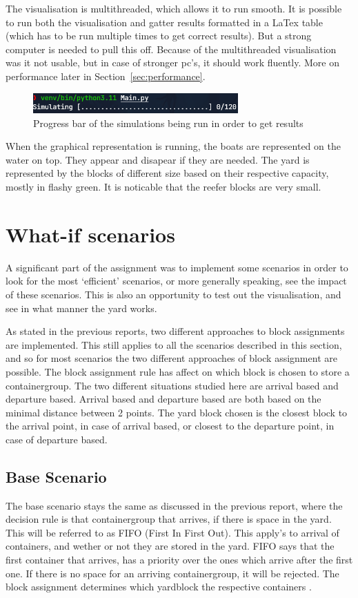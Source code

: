 \documentclass{article}
\begin{document}
The visualisation is multithreaded, which allows it to run smooth. It is
possible to run both the visualisation and gatter results formatted in a LaTex
table (which has to be run multiple times to get correct results). But a strong
computer is needed to pull this off. Because of the multithreaded visualisation
was it not usable, but in case of stronger pc's, it should work fluently. More
on performance later in Section~\ref{sec:performance}.
\begin{figure}
    \centering
    \includegraphics[width=0.7\textwidth]{fig/progressbar.png}
    \caption{Progress bar of the simulations being run in order to get results}\label{fig:visualisation}
\end{figure}

When the graphical representation is running, the boats are represented on the
water on top. They appear and disapear if they are needed. The yard is
represented by the blocks of different size based on their respective capacity,
mostly in flashy green. It is noticable that the reefer blocks are very small.

\section{What-if scenarios}
A significant part of the assignment was to implement some scenarios in order
to look for the most `efficient' scenarios, or more generally speaking, see the
impact of these scenarios. This is also an opportunity to test out the
visualisation, and see in what manner the yard works.

As stated in the previous reports, two different approaches to block
assignments are implemented. This still applies to all the scenarios described
in this section, and so for most scenarios the two different approaches of
block assignment are possible. The block assignment rule has affect on which
block is chosen to store a containergroup. The two different situations studied
here are arrival based and departure based. Arrival based and departure based
are both based on the minimal distance between 2 points. The yard block chosen
is the closest block to the arrival point, in case of arrival based, or closest
to the departure point, in case of departure based.

\subsection{Base Scenario}
The base scenario stays the same as discussed in the previous report, where the
decision rule is that containergroup that arrives, if there is space in the
yard. This will be referred to as FIFO (First In First Out). This apply’s to
arrival of containers, and wether or not they are stored in the yard. FIFO says
that the first container that arrives, has a priority over the ones which
arrive after the first one. If there is no space for an arriving
containergroup, it will be rejected. The block assignment determines which
yardblock the respective containers .
\end{document}
